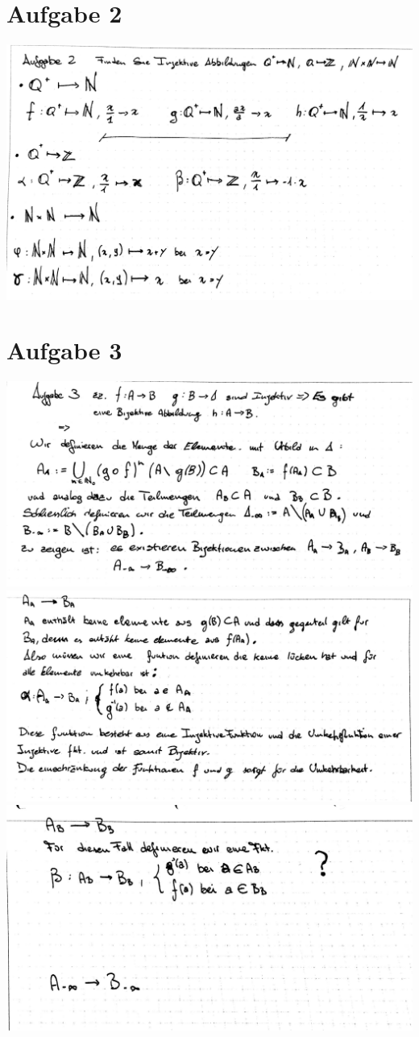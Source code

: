 \documentclass[14pt,a4paper,landscape]{article}
\begin{document}
\section*{Aufgabe 2}
\includegraphics[scale=0.3]{AB2-2_1.jpg} 
\section*{Aufgabe 3}
\includegraphics[scale=0.3]{Ab2-3_1.jpg} \newpage
\includegraphics[scale=0.3]{Ab2-3_2.jpg} \newpage
\includegraphics[scale=0.3]{Ab2-3_3.jpg} 
\end{document}
